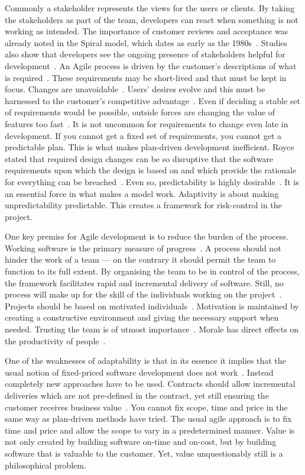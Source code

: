\documentclass[english]{tktltiki2}
\begin{document}
Commonly a stakeholder represents the views for the users or clients. By taking the stakeholders as part of the team, developers can react when something is not working as intended. The importance of customer reviews and acceptance was already noted in the Spiral model, which dates as early as the 1980s~\cite{Boe88}. Studies also show that developers see the ongoing presence of stakeholders helpful for development~\cite{DD08}. An Agile process is driven by the customer’s descriptions of what is required~\cite{BBB01b}. These requirements may be short-lived and that must be kept in focus. Changes are unavoidable~\cite{Fow05}. Users’ desires evolve and this must be harnessed to the customer’s competitive advantage~\cite{BBB01b, Fow05}. Even if deciding a stable set of requirements would be possible, outside forces are changing the value of features too fast~\cite{Fow05}. It is not uncommon for requirements to change even late in development. If you cannot get a fixed set of requirements, you cannot get a predictable plan. This is what makes plan-driven development inefficient. Royce stated that required design changes can be so disruptive that the software requirements upon which the design is based on and which provide the rationale for everything can be breached~\cite{Roy70}. Even so, predictability is highly desirable~\cite{Fow05}. It is an essential force in what makes a model work. Adaptivity is about making unpredictability predictable. This creates a framework for risk-control in the project.

One key premiss for Agile development is to reduce the burden of the process. Working software is the primary measure of progress~\cite{BBB01b}. A process should not hinder the work of a team — on the contrary it should permit the team to function to its full extent. By organising the team to be in control of the process, the framework facilitates rapid and incremental delivery of software. Still, no process will make up for the skill of the individuals working on the project~\cite{Boe88, Fow05}. Projects should be based on motivated individuals~\cite{BBB01b}. Motivation is maintained by creating a constructive environment and giving the necessary support when needed. Trusting the team is of utmost importance~\cite{BBB01b}. Morale has direct effects on the productivity of people~\cite{Fow05}.

One of the weaknesses of adaptability is that in its essence it implies that the usual notion of fixed-priced software development does not work~\cite{Pop02, TFR02, Fow05, HAB12}. Instead completely new approaches have to be used. Contracts should allow incremental deliveries which are not pre-defined in the contract, yet still ensuring the customer receives business value~\cite{Pop02}. You cannot fix scope, time and price in the same way as plan-driven methods have tried. The usual agile approach is to fix time and price and allow the scope to vary in a predetermined manner. Value is not only created by building software on-time and on-cost, but by building software that is valuable to the customer. Yet, value unquestionably still is a philosophical problem.
\end{document}
